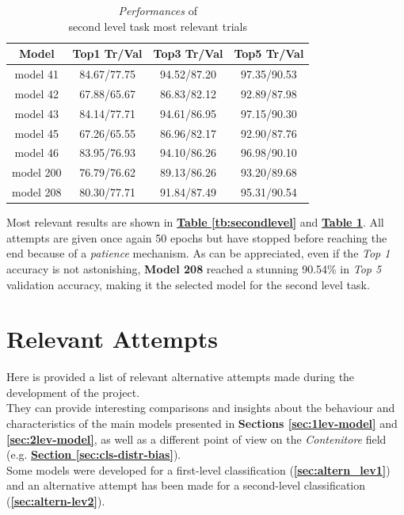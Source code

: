 \documentclass[12pt]{article}
\begin{document}
\begin{table}[h!]
	    \centering
	    \scriptsize
	    \begin{tabular}{ |c|c|c|c| }
        \hline
        \textbf{Model} & \textbf{Top1 Tr/Val} & \textbf{Top3 Tr/Val} & \textbf{Top5 Tr/Val}\\
        \hline
        model 41 & 84.67/77.75 & 94.52/87.20 & 97.35/90.53 \\
        model 42 & 67.88/65.67 & 86.83/82.12 & 92.89/87.98 \\
        model 43 & 84.14/77.71 & 94.61/86.95 & 97.15/90.30 \\
        model 45 & 67.26/65.55 & 86.96/82.17 & 92.90/87.76 \\
        model 46 & 83.95/76.93 & 94.10/86.26 & 96.98/90.10 \\
        model 200 & 76.79/76.62 & 89.13/86.26 & 93.20/89.68 \\
        model 208 & 80.30/77.71 & 91.84/87.49 & 95.31/90.54 \\
        \hline
        \end{tabular}
        \captionsetup{justification   = centering}
	    \caption{\textit{Performances} of \\second level task most relevant trials}
        \label{tb:secondlevelacc}
\end{table}

Most relevant results are shown in \hyperref[tb:secondlevel]{\textbf{Table \ref{tb:secondlevel}}} and \hyperref[tb:secondlevelacc]{\textbf{Table \ref{tb:secondlevelacc}}}. All attempts are given once again 50 epochs but have stopped before reaching the end because of a \textit{patience} mechanism.
\newline\newline
As can be appreciated, even if the \textit{Top 1} accuracy is not astonishing, \textbf{Model 208} reached a stunning 90.54\% in \textit{Top 5} validation accuracy, making it the selected model for the second level task.


\section{Relevant Attempts}
Here is provided a list of relevant alternative attempts made during the development of the project.\\
They can provide interesting comparisons and insights about the behaviour and characteristics of the main models presented in \textbf{Sections \ref{sec:1lev-model}} and \textbf{\ref{sec:2lev-model}}, as well as a different point of view on the \textit{Contenitore} field (e.g. \hyperref[sec:cls-distr-bias]{\textbf{Section \ref{sec:cls-distr-bias}}}).\\
Some models were developed for a first-level classification (\textbf{\ref{sec:altern_lev1}}) and an alternative attempt has been made for a second-level classification (\textbf{\ref{sec:altern-lev2}}).
\end{document}
